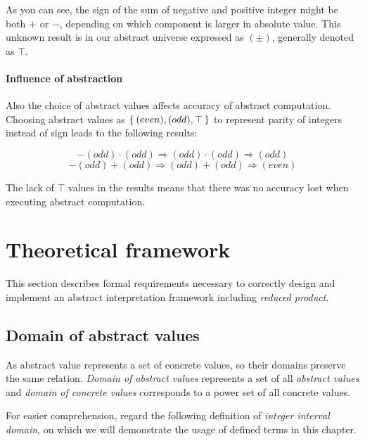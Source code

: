 \documentclass[12pt,oneside]{fithesis2}
\theoremstyle{definition}
\begin{document}
As you can see, the sign of the sum of negative and positive integer might be both $+$ or $-$, depending on which component is larger in absolute value. This unknown result is in our abstract universe expressed as $(\pm)$, generally denoted as $\top$.

\paragraph{Influence of abstraction}
Also the choice of abstract values affects accuracy of abstract computation. Choosing abstract values as $\Set{(even), (odd), \top}$ to represent parity of integers instead of sign leads to the following results:

\[ -(odd) \cdot (odd) \Rightarrow (odd) \cdot (odd) \Rightarrow (odd) \]
\[ -(odd) + (odd) \Rightarrow (odd) + (odd) \Rightarrow (even) \]

The lack of $\top$ values in the results means that there was no accuracy lost when executing abstract computation.

\section{Theoretical framework}

This section describes formal requirements necessary to correctly design and implement an abstract interpretation framework including \textit{reduced product}.

\subsection{Domain of abstract values}

As abstract value represents a set of concrete values, so their domains preserve the same relation. \textit{Domain of abstract values} represents a set of all \textit{abstract values} and \textit{domain of concrete values} corresponds to a power set of all concrete values.

For easier comprehension, regard the following definition of \textit{integer interval domain}\cite{mine-WING12}, on which we will demonstrate the usage of defined terms in this chapter.
\end{document}
